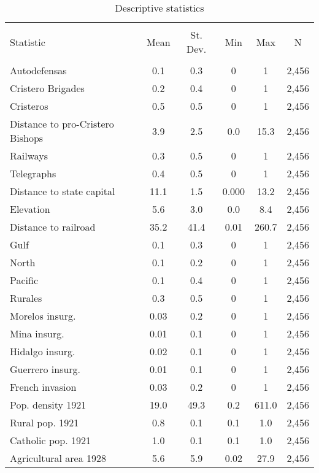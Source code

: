 
\begin{table}[!htbp] \centering 
  \caption{Descriptive statistics} 
  \label{} 
\begin{tabular}{@{\extracolsep{5pt}}lccccc} 
\\[-1.8ex]\hline 
\hline \\[-1.8ex] 
Statistic & \multicolumn{1}{c}{Mean} & \multicolumn{1}{c}{St. Dev.} & \multicolumn{1}{c}{Min} & \multicolumn{1}{c}{Max} & \multicolumn{1}{c}{N} \\ 
\hline \\[-1.8ex] 
Autodefensas & 0.1 & 0.3 & 0 & 1 & 2,456 \\ 
Cristero Brigades & 0.2 & 0.4 & 0 & 1 & 2,456 \\ 
Cristeros & 0.5 & 0.5 & 0 & 1 & 2,456 \\ 
Distance to pro-Cristero Bishops & 3.9 & 2.5 & 0.0 & 15.3 & 2,456 \\ 
Railways & 0.3 & 0.5 & 0 & 1 & 2,456 \\ 
Telegraphs & 0.4 & 0.5 & 0 & 1 & 2,456 \\ 
Distance to state capital & 11.1 & 1.5 & 0.000 & 13.2 & 2,456 \\ 
Elevation & 5.6 & 3.0 & 0.0 & 8.4 & 2,456 \\ 
Distance to railroad & 35.2 & 41.4 & 0.01 & 260.7 & 2,456 \\ 
Gulf & 0.1 & 0.3 & 0 & 1 & 2,456 \\ 
North & 0.1 & 0.2 & 0 & 1 & 2,456 \\ 
Pacific & 0.1 & 0.4 & 0 & 1 & 2,456 \\ 
Rurales & 0.3 & 0.5 & 0 & 1 & 2,456 \\ 
Morelos insurg. & 0.03 & 0.2 & 0 & 1 & 2,456 \\ 
Mina insurg. & 0.01 & 0.1 & 0 & 1 & 2,456 \\ 
Hidalgo insurg. & 0.02 & 0.1 & 0 & 1 & 2,456 \\ 
Guerrero insurg. & 0.01 & 0.1 & 0 & 1 & 2,456 \\ 
French invasion & 0.03 & 0.2 & 0 & 1 & 2,456 \\ 
Pop. density 1921 & 19.0 & 49.3 & 0.2 & 611.0 & 2,456 \\ 
Rural pop. 1921 & 0.8 & 0.1 & 0.1 & 1.0 & 2,456 \\ 
Catholic pop. 1921 & 1.0 & 0.1 & 0.1 & 1.0 & 2,456 \\ 
Agricultural area 1928 & 5.6 & 5.9 & 0.02 & 27.9 & 2,456 \\ 

\end{tabular}
\end{table}
